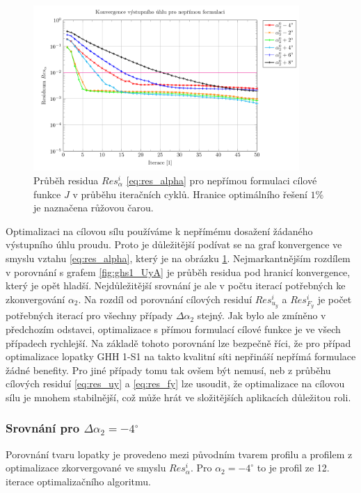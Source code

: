 \begin{figure}[H]
	\includegraphics[width=0.9\textwidth]{img/FyA.pdf}
	\caption[Průběh residua $ Res_{\alpha}^i $, nepřímá formulace]{Průběh residua $ Res_{\alpha}^i $ \ref{eq:res_alpha} pro nepřímou formulaci cílové funkce $ J $ v průběhu iteračních cyklů. Hranice optimálního řešení $ 1\% $ je naznačena růžovou čarou.}
	\label{fig:ghs1_FyA}
\end{figure}

Optimalizaci na cílovou sílu používáme k nepřímému dosažení žádaného výstupního úhlu proudu. Proto je důležitější podívat se na graf konvergence ve smyslu vztahu \ref{eq:res_alpha}, který je na obrázku \ref{fig:ghs1_FyA}. Nejmarkantnějším rozdílem v porovnání s grafem \ref{fig:ghs1_UyA} je průběh residua pod hranicí konvergence, který je opět hladší. Nejdůležitější srovnání je ale v počtu iterací potřebných ke zkonvergování $ \alpha_2 $. Na rozdíl od porovnání cílových residuí $ Res_{u_y}^i $ a $ Res_{F_y}^i $ je počet potřebných iterací pro všechny případy $ \Delta\alpha_2 $ stejný. Jak bylo ale zmíněno v předchozím odstavci, optimalizace s přímou formulací cílové funkce je ve všech případech rychlejší. Na základě tohoto porovnání lze bezpečně říci, že pro případ optimalizace lopatky GHH 1-S1 na takto kvalitní síti nepřináší nepřímá formulace žádné benefity. Pro jiné případy tomu tak ovšem být nemusí, neb z průběhu cílových residuí \ref{eq:res_uy} a \ref{eq:res_fy} lze usoudit, že optimalizace na cílovou sílu je mnohem stabilnější, což může hrát ve složitějších aplikacích důležitou roli.
\newpage
\subsubsection{Srovnání pro $ \Delta \alpha_2=-4^{\circ} $}

Porovnání tvaru lopatky je provedeno mezi původním tvarem profilu a profilem z optimalizace zkorvergované ve smyslu $ Res_{\alpha}^i $. Pro $ \alpha_2=-4^\circ $ to je profil ze 12. iterace optimalizačního algoritmu.


